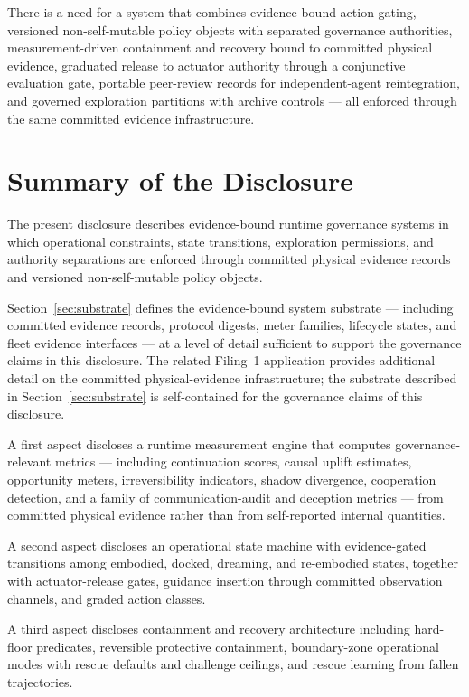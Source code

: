 \documentclass[a4paper,12pt]{article}
\begin{document}
There is a need for a system that combines evidence-bound action gating, versioned
non-self-mutable policy objects with separated governance authorities,
measurement-driven containment and recovery bound to committed
physical evidence, graduated release to actuator authority through a
conjunctive evaluation gate, portable peer-review records for
independent-agent reintegration, and governed exploration partitions
with archive controls --- all enforced through the same committed
evidence infrastructure.

\section{Summary of the Disclosure}

The present disclosure describes evidence-bound runtime governance
systems in which operational constraints, state transitions,
exploration permissions, and authority separations are enforced through
committed physical evidence records and versioned non-self-mutable
policy objects.

Section~\ref{sec:substrate} defines the evidence-bound system
substrate --- including committed evidence records, protocol digests,
meter families, lifecycle states, and fleet evidence interfaces --- at
a level of detail sufficient to support the governance claims in this
disclosure. The related Filing~1 application provides additional detail on the
committed physical-evidence infrastructure; the substrate described in
Section~\ref{sec:substrate} is self-contained for the governance
claims of this disclosure.

A first aspect discloses a runtime measurement engine that computes
governance-relevant metrics --- including continuation scores, causal
uplift estimates, opportunity meters, irreversibility indicators,
shadow divergence, cooperation detection, and a family of
communication-audit and deception metrics --- from committed physical
evidence rather than from self-reported internal quantities.

A second aspect discloses an operational state machine with
evidence-gated transitions among embodied, docked, dreaming, and
re-embodied states, together with actuator-release gates, guidance
insertion through committed observation channels, and graded action
classes.

A third aspect discloses containment and recovery architecture
including hard-floor predicates, reversible protective containment,
boundary-zone operational modes with rescue defaults and challenge
ceilings, and rescue learning from fallen trajectories.
\end{document}
